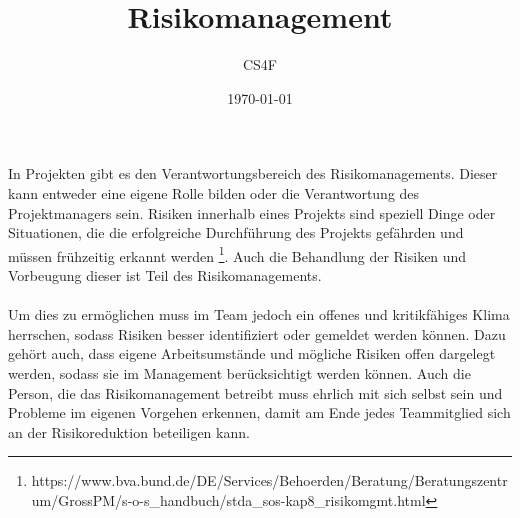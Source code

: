 \documentclass[a4paper]{article}
\title{\vspace{-2cm}Risikomanagement}
\author{CS4F}
\date{\today}
\begin{document}
\maketitle

In Projekten gibt es den Verantwortungsbereich des Risikomanagements. Dieser kann entweder eine eigene Rolle bilden oder die Verantwortung des Projektmanagers sein. Risiken innerhalb eines Projekts sind speziell Dinge oder Situationen, die die erfolgreiche Durchführung des Projekts gefährden und müssen frühzeitig erkannt werden \footnote{https://www.bva.bund.de/DE/Services/Behoerden/Beratung/Beratungszentrum/GrossPM/s-o-s\_handbuch/stda\_sos-kap8\_risikomgmt.html}.
Auch die Behandlung der Risiken und Vorbeugung dieser ist Teil des Risikomanagements.\\
\\ Um dies zu ermöglichen muss im Team jedoch ein offenes und kritikfähiges Klima herrschen, sodass Risiken besser identifiziert oder gemeldet werden können. Dazu gehört auch, dass eigene Arbeitsumstände und mögliche Risiken offen dargelegt werden, sodass sie im Management berücksichtigt werden können. Auch die Person, die das Risikomanagement betreibt muss ehrlich mit sich selbst sein und Probleme im eigenen Vorgehen erkennen, damit am Ende jedes Teammitglied sich an der Risikoreduktion beteiligen kann.\\
\end{document}
